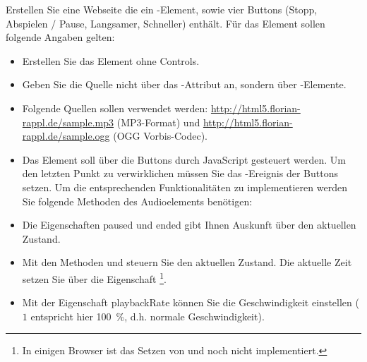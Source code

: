 %
\par Erstellen Sie eine Webseite die ein -Element, sowie vier
Buttons (Stopp, Abspielen / Pause, Langsamer, Schneller) enthält. Für das
Element sollen folgende Angaben gelten:
%
\begin{itemize}
\item
Erstellen Sie das Element ohne Controls.
\item
Geben Sie die Quelle nicht über das -Attribut an, sondern über
-Elemente.
\item
Folgende Quellen sollen verwendet werden:
\url{http://html5.florian-rappl.de/sample.mp3} (MP3-Format) und
\url{http://html5.florian-rappl.de/sample.ogg} (OGG Vorbis-Codec).
\item
Das Element soll über die Buttons durch JavaScript gesteuert werden. Um den
letzten Punkt zu verwirklichen müssen Sie das -Ereignis der
Buttons setzen. Um die entsprechenden Funktionalitäten zu implementieren werden
Sie folgende Methoden des Audioelements benötigen:
\item
Die Eigenschaften paused und ended gibt Ihnen Auskunft über den aktuellen
Zustand.
\item
Mit den Methoden  und  steuern Sie den aktuellen
Zustand. Die aktuelle Zeit setzen Sie über die Eigenschaft
\footnote{In einigen Browser ist das Setzen von
 und  noch nicht implementiert.}.
\item
Mit der Eigenschaft playbackRate können Sie die Geschwindigkeit einstellen
($1$ entspricht hier \qty{100}{\%}, d.h. normale Geschwindigkeit).
\end{itemize}